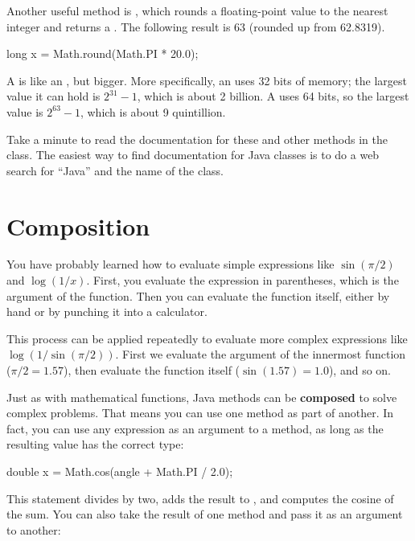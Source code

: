Another useful method is , which rounds a floating-point value to the nearest integer and returns a .
The following result is 63 (rounded up from 62.8319).

\begin{code}
long x = Math.round(Math.PI * 20.0);
\end{code}

A  is like an , but bigger.
More specifically, an  uses 32 bits of memory; the largest value it can hold is $2^{31}-1$, which is about 2 billion.
A  uses 64 bits, so the largest value is $2^{63}-1$, which is about 9 quintillion.

Take a minute to read the documentation for these and other methods in the  class.
The easiest way to find documentation for Java classes is to do a web search for ``Java'' and the name of the class.


\section{Composition}


You have probably learned how to evaluate simple expressions like $\sin(\pi/2)$ and $\log(1/x)$.
First, you evaluate the expression in parentheses, which is the argument of the function.
Then you can evaluate the function itself, either by hand or by punching it into a calculator.

This process can be applied repeatedly to evaluate more complex expressions like $\log(1/\sin(\pi/2))$.
First we evaluate the argument of the innermost function ($\pi/2 = 1.57$), then evaluate the function itself ($\sin(1.57) = 1.0$), and so on.


Just as with mathematical functions, Java methods can be {\bf composed} to solve complex problems.
That means you can use one method as part of another.
In fact, you can use any expression as an argument to a method, as long as the resulting value has the correct type:

\begin{code}
double x = Math.cos(angle + Math.PI / 2.0);
\end{code}

This statement divides  by two, adds the result to , and computes the cosine of the sum.
You can also take the result of one method and pass it as an argument to another:

